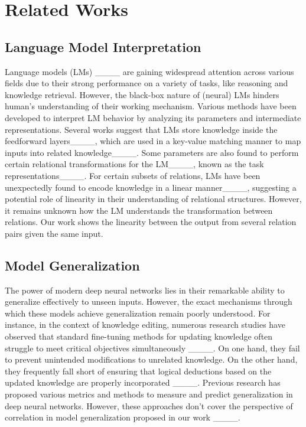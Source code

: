 \section{Related Works}
\subsection{Language Model Interpretation}
Language models (LMs) ____ are gaining widespread attention across various fields due to their strong performance on a variety of tasks, like reasoning and knowledge retrieval. However, the black-box nature of (neural) LMs hinders human's understanding of their working mechanism. Various methods have been developed to interpret LM behavior by analyzing its parameters and intermediate representations. Several works suggest that LMs store knowledge inside the feedforward layers____, which are used in a key-value matching manner to map inputs into related knowledge____. Some parameters are also found to perform certain relational transformations for the LM____, known as the task representations____.
For certain subsets of relations, LMs have been unexpectedly found to encode knowledge in a linear manner____, suggesting a potential role of linearity in their understanding of relational structures. However, it remains unknown how the LM understands the transformation between relations. Our work shows the linearity between the output from several relation pairs given the same input.

\subsection{Model Generalization}


The power of modern deep neural networks lies in their remarkable ability to generalize effectively to unseen inputs. However, the exact mechanisms through which these models achieve generalization remain poorly understood. For instance, in the context of knowledge editing, numerous research studies have observed that standard fine-tuning methods for updating knowledge often struggle to meet critical objectives simultaneously ____. On one hand, they fail to prevent unintended modifications to unrelated knowledge. On the other hand, they frequently fall short of ensuring that logical deductions based on the updated knowledge are properly incorporated ____. 
Previous research has proposed various metrics and methods to measure and predict generalization in deep neural networks. However, these approaches don't cover the perspective of correlation in model generalization proposed in our work ____.

